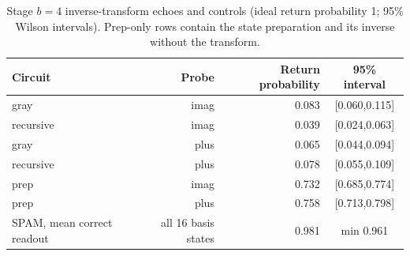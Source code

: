 \begin{table}[htbp]\centering\small
\caption{Stage $b=4$ inverse-transform echoes and controls (ideal return probability 1; 95\% Wilson intervals). Prep-only rows contain the state preparation and its inverse without the transform.}
\label{tab:hw-echo-b4}\begin{tabular}{lrrc}\toprule Circuit & Probe & Return probability & 95\% interval\\\midrule
gray & imag & 0.083 & [0.060,0.115]\\
recursive & imag & 0.039 & [0.024,0.063]\\
gray & plus & 0.065 & [0.044,0.094]\\
recursive & plus & 0.078 & [0.055,0.109]\\
prep & imag & 0.732 & [0.685,0.774]\\
prep & plus & 0.758 & [0.713,0.798]\\
\midrule
SPAM, mean correct readout & all 16 basis states & 0.981 & min 0.961\\
\bottomrule\end{tabular}\end{table}
